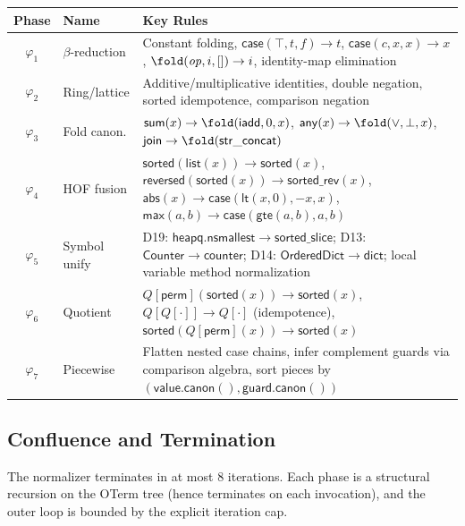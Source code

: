 \begin{center}
\begin{tabular}{clp{6.5cm}}
\hline
\textbf{Phase} & \textbf{Name} & \textbf{Key Rules} \\
\hline
$\varphi_1$ & $\beta$-reduction
  & Constant folding, $\mathsf{case}(\top, t, f) \to t$,
    $\mathsf{case}(c, x, x) \to x$, $\fold(\mathit{op}, i, []) \to i$,
    identity-map elimination \\
$\varphi_2$ & Ring/lattice
  & Additive/multiplicative identities, double negation, sorted
    idempotence, comparison negation \\
$\varphi_3$ & Fold canon.
  & $\mathsf{sum}(x) \to \fold(\mathsf{iadd}, 0, x)$,
    $\mathsf{any}(x) \to \fold(\lor, \bot, x)$,
    $\mathsf{join} \to \fold(\mathsf{str\_concat})$ \\
$\varphi_4$ & HOF fusion
  & $\mathsf{sorted}(\mathsf{list}(x)) \to \mathsf{sorted}(x)$,
    $\mathsf{reversed}(\mathsf{sorted}(x)) \to \mathsf{sorted\_rev}(x)$,
    $\mathsf{abs}(x) \to \mathsf{case}(\mathsf{lt}(x,0), -x, x)$,
    $\mathsf{max}(a,b) \to \mathsf{case}(\mathsf{gte}(a,b), a, b)$ \\
$\varphi_5$ & Symbol unify
  & D19: $\mathsf{heapq.nsmallest} \to \mathsf{sorted\_slice}$;
    D13: $\mathsf{Counter} \to \mathsf{counter}$;
    D14: $\mathsf{OrderedDict} \to \mathsf{dict}$;
    local variable method normalization \\
$\varphi_6$ & Quotient
  & $Q[\mathsf{perm}](\mathsf{sorted}(x)) \to \mathsf{sorted}(x)$,
    $Q[Q[\cdot]] \to Q[\cdot]$ (idempotence),
    $\mathsf{sorted}(Q[\mathsf{perm}](x)) \to \mathsf{sorted}(x)$ \\
$\varphi_7$ & Piecewise
  & Flatten nested case chains, infer complement guards via
    comparison algebra, sort pieces by
    $(\mathsf{value.canon()}, \mathsf{guard.canon()})$ \\
\hline
\end{tabular}
\end{center}

\subsection{Confluence and Termination}

\begin{proposition}[Termination]
\label{prop:normalizer-termination}
The normalizer terminates in at most 8 iterations.  Each phase is
a structural recursion on the OTerm tree (hence terminates on each
invocation), and the outer loop is bounded by the explicit iteration
cap.
\end{proposition}

